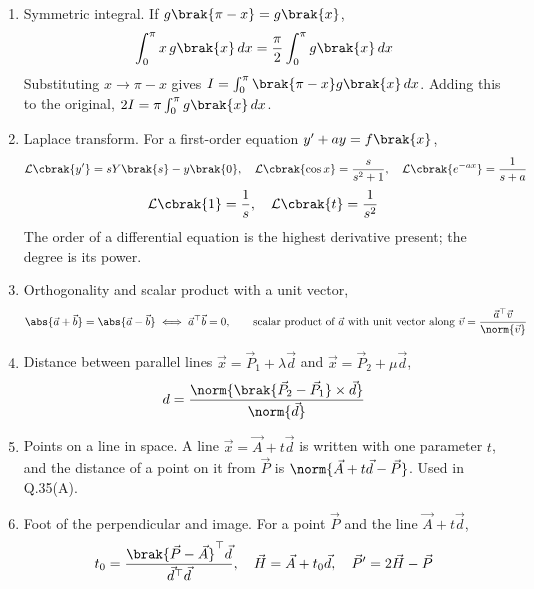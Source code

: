 \begin{enumerate}[label=\thesubsection.\arabic*, ref=\thesubsection.\theenumi]
\item Symmetric integral. If $g\brak{\pi - x} = g\brak{x}$,
\begin{align}
	\int_0^\pi x\,g\brak{x}\,dx = \frac{\pi}{2}\int_0^\pi g\brak{x}\,dx \label{eq:CBSE12-king}
\end{align}
\solution
Substituting $x \to \pi - x$ gives $I = \int_0^\pi\brak{\pi - x}g\brak{x}\,dx$. Adding this to the original, $2I = \pi\int_0^\pi g\brak{x}\,dx$.
\item Laplace transform. For a first-order equation $y^{\prime} + ay = f\brak{x}$,
\begin{align}
	\mathcal{L}\cbrak{y^{\prime}} = sY\brak{s} - y\brak{0}, \quad \mathcal{L}\cbrak{\cos x} = \frac{s}{s^2+1}, \quad \mathcal{L}\cbrak{e^{-ax}} = \frac{1}{s+a} \label{eq:CBSE12-laplace}
\end{align}
\begin{align}
	\mathcal{L}\cbrak{1} = \frac{1}{s}, \quad \mathcal{L}\cbrak{t} = \frac{1}{s^2} \label{eq:CBSE12-laplace2}
\end{align}
The order of a differential equation is the highest derivative present; the degree is its power. 
\item Orthogonality and scalar product with a unit vector,
\begin{align}
	\abs{\vec{a}+\vec{b}} = \abs{\vec{a}-\vec{b}} \iff \vec{a}^{\top}\vec{b} = 0, \qquad
	\text{scalar product of } \vec{a} \text{ with unit vector along } \vec{v} = \frac{\vec{a}^{\top}\vec{v}}{\norm{\vec{v}}} \label{eq:CBSE12-vec}
\end{align}
\item Distance between parallel lines $\vec{x} = \vec{P}_1 + \lambda\vec{d}$ and $\vec{x} = \vec{P}_2 + \mu\vec{d}$,
\begin{align}
	d = \frac{\norm{\brak{\vec{P}_2 - \vec{P}_1}\times\vec{d}}}{\norm{\vec{d}}} \label{eq:CBSE12-pardist}
\end{align}

\item Points on a line in space. A line $\vec{x} = \vec{A} + t\vec{d}$ is written with one parameter $t$, and the distance of a point on it from $\vec{P}$ is $\norm{\vec{A} + t\vec{d} - \vec{P}}$. Used in Q.35(A).
\item Foot of the perpendicular and image. For a point $\vec{P}$ and the line $\vec{A} + t\vec{d}$,
\begin{align}
	t_0 = \frac{\brak{\vec{P}-\vec{A}}^{\top}\vec{d}}{\vec{d}^{\top}\vec{d}}, \quad \vec{H} = \vec{A} + t_0\vec{d}, \quad \vec{P}^{\prime} = 2\vec{H} - \vec{P} \label{eq:CBSE12-image}
\end{align}


\end{enumerate}
